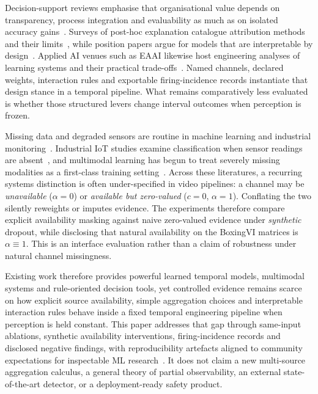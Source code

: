 \documentclass[preprint,12pt,numbers,sort&compress]{elsarticle}
\begin{document}
Decision-support reviews emphasise that organisational value depends on transparency, process integration and evaluability as much as on isolated accuracy gains~\cite{duan2019ai,dwivedi2021ai}.
Surveys of post-hoc explanation catalogue attribution methods and their limits~\cite{guidotti2018survey}, while position papers argue for models that are interpretable by design~\cite{rudin2019interpretable,doshi2017towards,lipton2018mythos}.
Applied AI venues such as EAAI likewise host engineering analyses of learning systems and their practical trade-offs~\cite{ganaie2022ensemble}.
Named channels, declared weights, interaction rules and exportable firing-incidence records instantiate that design stance in a temporal pipeline.
What remains comparatively less evaluated is whether those structured levers change interval outcomes when perception is frozen.

Missing data and degraded sensors are routine in machine learning and industrial monitoring~\cite{emmanuel2021missing,teh2020sensorquality,lei2020fault}.
Industrial IoT studies examine classification when sensor readings are absent~\cite{dzaferagic2021missing}, and multimodal learning has begun to treat severely missing modalities as a first-class training setting~\cite{ma2021smil}.
Across these literatures, a recurring systems distinction is often under-specified in video pipelines: a channel may be \emph{unavailable} ($\alpha{=}0$) or \emph{available but zero-valued} ($c{=}0$, $\alpha{=}1$).
Conflating the two silently reweights or imputes evidence.
The experiments therefore compare explicit availability masking against naive zero-valued evidence under \emph{synthetic} dropout, while disclosing that natural availability on the BoxingVI matrices is $\alpha{\equiv}1$.
This is an interface evaluation rather than a claim of robustness under natural channel missingness.

Existing work therefore provides powerful learned temporal models, multimodal systems and rule-oriented decision tools, yet controlled evidence remains scarce on how explicit source availability, simple aggregation choices and interpretable interaction rules behave inside a fixed temporal engineering pipeline when perception is held constant.
This paper addresses that gap through same-input ablations, synthetic availability interventions, firing-incidence records and disclosed negative findings, with reproducibility artefacts aligned to community expectations for inspectable ML research~\cite{pineau2021reproducibility,kapoor2023leakage}.
It does not claim a new multi-source aggregation calculus, a general theory of partial observability, an external state-of-the-art detector, or a deployment-ready safety product.
\end{document}
